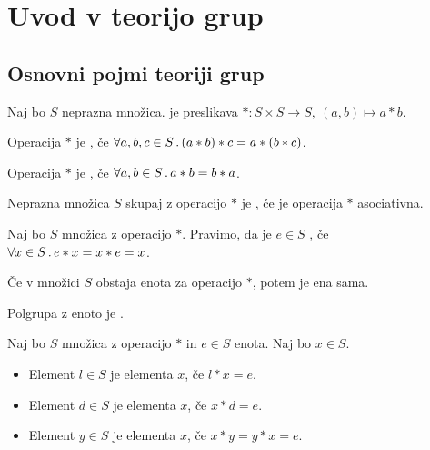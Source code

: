 \section{Uvod v teorijo grup}
\subsection{Osnovni pojmi teoriji grup}
\begin{definicija}
    Naj bo $S$ neprazna množica.  je preslikava $*: S \times S \to S, \ (a,b) \mapsto a * b$.

    Operacija $*$ je , če $\forall a, b, c \in S \,.\, (a*b)*c = a*(b*c)$.

    Operacija $*$ je , če $\forall a, b \in S \,.\, a* b = b* a$.
\end{definicija}

\begin{definicija}
    Neprazna množica $S$ skupaj z operacijo $*$ je , če je operacija $*$ asociativna.
\end{definicija}

\begin{definicija}
    Naj bo $S$ množica z operacijo $*$. Pravimo, da je $e \in S$ , če~$\forall x \in S \,.\, e * x = x * e = x$.
\end{definicija}

\begin{trditev}
    Če v množici $S$ obstaja enota za operacijo $*$, potem je ena sama.
\end{trditev}

\begin{definicija}
    Polgrupa z enoto je .
\end{definicija}

\begin{definicija}
    Naj bo $S$ množica z operacijo $*$ in $e \in S$ enota. Naj bo $x \in S$.
    \begin{itemize}
        \item Element $l \in S$ je  elementa $x$, če $l * x = e$.
        \item Element $d \in S$ je  elementa $x$, če $x * d = e$.
        \item Element $y \in S$ je  elementa $x$, če $x *y = y* x = e$.
    \end{itemize}
\end{definicija}

